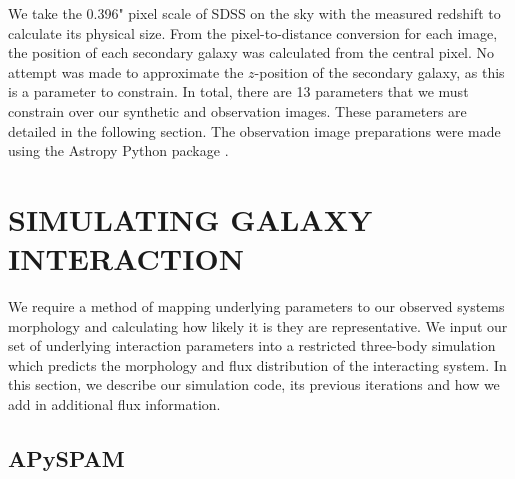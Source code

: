 We take the 0.396" pixel scale of SDSS on the sky with the measured redshift to calculate its physical size. From the pixel-to-distance conversion for each image, the position of each secondary galaxy was calculated from the central pixel. No attempt was made to approximate the $z$-position of the secondary galaxy, as this is a parameter to constrain. In total, there are 13 parameters that we must constrain over our synthetic and observation images. These parameters are detailed in the following section. The observation image preparations were made using the Astropy Python package \citep{astropy_2013, astropy_2018}.

\section{SIMULATING GALAXY INTERACTION}\label{Methods: sims}
\noindent We require a method of mapping underlying parameters to our observed systems morphology and calculating how likely it is they are representative. We input our set of underlying interaction parameters into a restricted three-body simulation which predicts the morphology and flux distribution of the interacting system. In this section, we describe our simulation code, its previous iterations and how we add in additional flux information.

\subsection{APySPAM}\label{sec:simulations}
